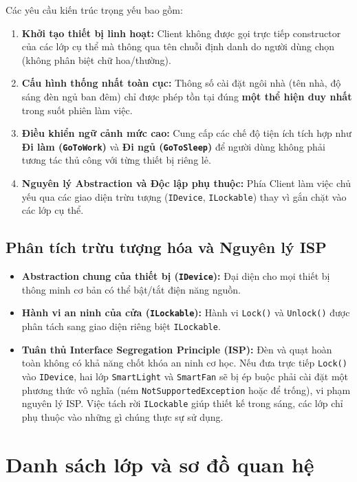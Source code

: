 \documentclass[11pt,a4paper]{article}
\begin{document}
Các yêu cầu kiến trúc trọng yếu bao gồm:
\begin{enumerate}[itemsep=1.2pt]
    \item \textbf{Khởi tạo thiết bị linh hoạt:} Client không được gọi trực tiếp constructor của các lớp cụ thể mà thông qua tên chuỗi định danh do người dùng chọn (không phân biệt chữ hoa/thường).
    \item \textbf{Cấu hình thống nhất toàn cục:} Thông số cài đặt ngôi nhà (tên nhà, độ sáng đèn ngủ ban đêm) chỉ được phép tồn tại đúng \textbf{một thể hiện duy nhất} trong suốt phiên làm việc.
    \item \textbf{Điều khiển ngữ cảnh mức cao:} Cung cấp các chế độ tiện ích tích hợp như \textbf{Đi làm (\texttt{GoToWork})} và \textbf{Đi ngủ (\texttt{GoToSleep})} để người dùng không phải tương tác thủ công với từng thiết bị riêng lẻ.
    \item \textbf{Nguyên lý Abstraction và Độc lập phụ thuộc:} Phía Client làm việc chủ yếu qua các giao diện trừu tượng (\texttt{IDevice}, \texttt{ILockable}) thay vì gắn chặt vào các lớp cụ thể.
\end{enumerate}

\subsection{Phân tích trừu tượng hóa và Nguyên lý ISP}
\begin{itemize}[itemsep=1.2pt]
    \item \textbf{Abstraction chung của thiết bị (\texttt{IDevice}):} Đại diện cho mọi thiết bị thông minh cơ bản có thể bật/tắt điện năng nguồn.
    \item \textbf{Hành vi an ninh của cửa (\texttt{ILockable}):} Hành vi \texttt{Lock()} và \texttt{Unlock()} được phân tách sang giao diện riêng biệt \texttt{ILockable}.
    \item \textbf{Tuân thủ Interface Segregation Principle (ISP):} Đèn và quạt hoàn toàn không có khả năng chốt khóa an ninh cơ học. Nếu đưa trực tiếp \texttt{Lock()} vào \texttt{IDevice}, hai lớp \texttt{SmartLight} và \texttt{SmartFan} sẽ bị ép buộc phải cài đặt một phương thức vô nghĩa (ném \texttt{NotSupportedException} hoặc để trống), vi phạm nguyên lý ISP. Việc tách rời \texttt{ILockable} giúp thiết kế trong sáng, các lớp chỉ phụ thuộc vào những gì chúng thực sự sử dụng.
\end{itemize}

\newpage

\section{Danh sách lớp và sơ đồ quan hệ}
\end{document}
